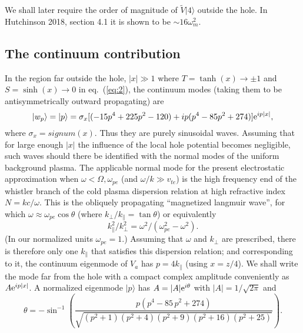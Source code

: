 \documentclass[12pt]{article}
\def\ket#1{|#1\rangle}
\def\etothe#1{{\rm e}^{#1}}
\begin{document}
We shall later require  the order of magnitude of $\tilde V\ket{4}$
outside the hole.  In Hutchinson 2018,
section 4.1 it is shown to be $\sim 16\omega_m^2$.


\subsection{The continuum contribution}

In the region far outside the hole, $|x|\gg 1$ where
$T=\tanh(x)\to\pm1$ and $S=\sinh(x)\to0$ in eq.\ (\ref{eq:2}), the continuum
modes (taking them to be antisymmetrically outward propagating) are
\begin{equation}
  \label{eq:14}
 \ket{w_p}= \ket{p}=\sigma_x [(-15p^4+225p^2-120)+ip(p^4-85p^2+274)]{\rm e}^{ip|x|},
\end{equation}
where $\sigma_x=signum(x)$. Thus they are purely sinusoidal
waves. Assuming that for large enough $|x|$ the influence of the local
hole potential becomes negligible, such waves should there be
identified with the normal modes of the uniform background plasma.
The applicable normal mode for the present electrostatic approximation
when $\omega<\Omega,\omega_{pe}$ (and $\omega/k\gg v_{te}$) is the high
frequency end of the whistler branch of the cold plasma dispersion
relation at high refractive index $N=kc/\omega$. This is the obliquely
propagating ``magnetized langmuir wave'', for which
$\omega\approx\omega_{pe}\cos\theta$ (where
$k_\perp/k_\parallel=\tan\theta$) or equivalently
\begin{equation}
  \label{eq:15}
  k_\parallel^2/k_\perp^2=\omega^2/(\omega_{pe}^2-\omega^2).
\end{equation}
(In our normalized units $\omega_{pe}=1$.)  Assuming that $\omega$ and
$k_\perp$ are prescribed, there is therefore only one $k_\parallel$
that satisfies this dispersion relation; and corresponding to it, the
continuum eigenmode of $V_a$ has $p=4k_\parallel$ (using $x=z/4$). We
shall write the mode far from the hole with a compact complex
amplitude conveniently as $A{\rm e}^{ip|x|}$. A normalized
eigenmode $\ket{p}$ has $A=|A|\etothe{i\theta}$ with $|A|=1/\sqrt{2\pi}$
and
\begin{equation}
  \label{eq:19}
  \theta=-\sin^{-1} \left(\frac{ p\left( p^{4}-85\,p^{2}+274 \right) }
      { \sqrt{ \left( p^{2}+1 \right)  \left( p^{2}+4 \right)
          \left( p^{2}+9 \right)  \left( p^{2}+16 \right)  \left(
            p^{2}+25 \right)} }\right).
\end{equation}
\end{document}
